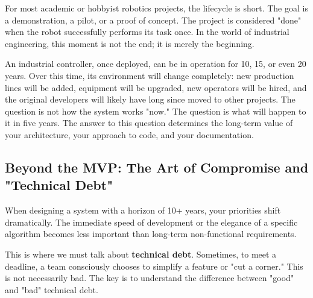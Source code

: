 For most academic or hobbyist robotics projects, the lifecycle is short. The goal is a demonstration, a pilot, or a proof of concept. The project is considered "done" when the robot successfully performs its task once. In the world of industrial engineering, this moment is not the end; it is merely the beginning.

An industrial controller, once deployed, can be in operation for 10, 15, or even 20 years. Over this time, its environment will change completely: new production lines will be added, equipment will be upgraded, new operators will be hired, and the original developers will likely have long since moved to other projects. The question is not how the system works "now." The question is what will happen to it in five years. The answer to this question determines the long-term value of your architecture, your approach to code, and your documentation.

\subsection{Beyond the MVP: The Art of Compromise and "Technical Debt"}
\label{subsec:technical_debt}

When designing a system with a horizon of 10+ years, your priorities shift dramatically. The immediate speed of development or the elegance of a specific algorithm becomes less important than long-term non-functional requirements.

This is where we must talk about \textbf{technical debt}. Sometimes, to meet a deadline, a team consciously chooses to simplify a feature or "cut a corner." This is not necessarily bad. The key is to understand the difference between "good" and "bad" technical debt.

